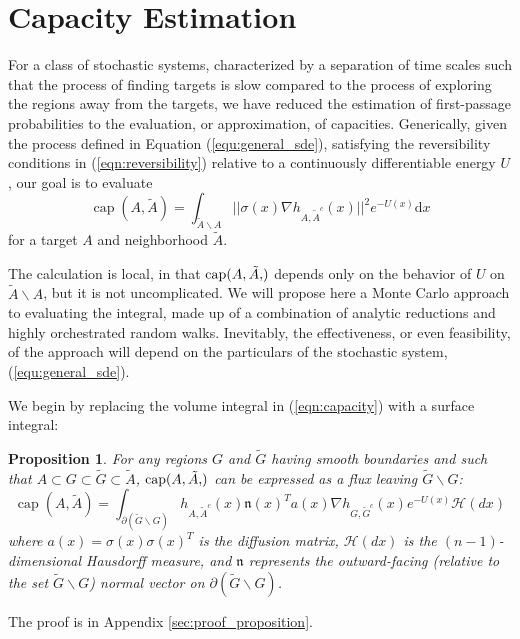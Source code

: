 \documentclass[nofootinbib,english, aip, jcp, priprint, graphicx,floatfix]{revtex4-1}
\newtheorem{proposition}{Proposition}
\theoremstyle{plain}
\theoremstyle{definition}
\theoremstyle{plain}
\newcommand{\normal}{{\mathfrak{n}}}
\newcommand{\capac}[2]{\ensuremath{\operatorname{cap}}(#1,#2)}
\newcommand{\hausdorffmeasure}{\mathscr{H}(dx)}
\newcommand{\tA}{{\tilde A}}
\begin{document}
\section{Capacity Estimation} 
\label{sec:Estimation}
For a class of stochastic systems, characterized by a separation of time scales such that the process of finding targets is slow compared to the process of exploring the regions away from the targets, we have reduced the estimation of first-passage probabilities to the evaluation, or approximation, of capacities.
Generically, given the process defined in Equation (\ref{equ:general_sde}), satisfying the reversibility conditions in (\ref{eqn:reversibility}) relative to a continuously differentiable energy $U$, our goal is to evaluate
\begin{equation}
\label{eqn:capacity}
\ensuremath{\operatorname{cap}} (A, \tilde{A}) = \int_{\tilde A \backslash A}
||\sigma(x) \nabla h_{A, \tilde{A}^c}(x)||^2 e^{- U(x)} \mathrm{d} x 
\end{equation}
for a target $A$ and neighborhood $\tA$.

The calculation is local, in that $\capac{A,\tilde{A}}$ depends only on the behavior of  $U$ on $\tA\backslash A$, but it is not uncomplicated. We will propose here a Monte Carlo approach to evaluating the integral, made up of a combination of analytic reductions and highly orchestrated random walks. Inevitably, the effectiveness, or even feasibility, of the approach will depend on the particulars of the stochastic system, (\ref{equ:general_sde}).

We begin by replacing the volume integral in (\ref{eqn:capacity}) with a surface integral:

\begin{proposition}
\label{prop:flux}
For any regions $G$ and $\tilde{G}$ having smooth boundaries and such that $A\subset G \subset \tilde G \subset \tilde A$, $\capac{A,\tA}$ can be expressed as a flux leaving $\tilde G \backslash G$:
\begin{equation}
\label{eqn:GIntegral}
\ensuremath{\operatorname{cap}} (A, \tilde{A}) = \int_{\partial (\tilde G \backslash G)}  h_{A, \tilde{A}^c} (x)   \normal(x)^T a (x) \nabla h_{G, \tilde{G}^c} (x)e^{- U (x)} \hausdorffmeasure
\end{equation}
where $a(x)=\sigma(x)\sigma(x)^T$ is the diffusion matrix, $\hausdorffmeasure$ is the $(n-1)$-dimensional Hausdorff measure, and $\normal$ represents the outward-facing (relative to the set $\tilde G \backslash G$) normal vector on $\partial (\tilde G \backslash G)$.
\end{proposition}
\noindent The proof is in Appendix \ref{sec:proof_proposition}.
\end{document}
